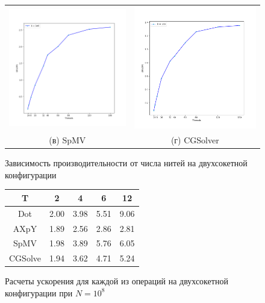 \documentclass[12pt, a4paper]{article}
\begin{document}
\begin{figure}[H]
\begin{tabular}{cc}
		\includegraphics[width=85mm]{multithread_polus_spmv2} & \includegraphics[width=85mm]{multithread_polus_cgsolver2} \\
		(в) SpMV & (г) CGSolver \\[6pt]
	\end{tabular}
	\caption{Зависимость производительности от числа нитей на двухсокетной конфигурации}
	\label{fig:multithread_flops_polus2} 
\end{figure}
\fi

\begin{figure}[H]
	\center
	\setlength{\tabcolsep}{10pt}
	\renewcommand{\arraystretch}{1.5}
		\begin{tabular}{|c|c|c|c|c|}
		\hline
		T & 2 & 4 & 6 & 12  \\
		\hline
		Dot & 2.00 & 3.98 & 5.51 & 9.06 \\
		\hline
		AXpY & 1.89 & 2.56 & 2.86 & 2.81 \\
		\hline
		SpMV & 1.98 & 3.89 & 5.76 & 6.05 \\
		\hline
		CGSolve & 1.94 & 3.62 & 4.71 & 5.24 \\
		\hline
	\end{tabular}
	\caption{Расчеты ускорения для каждой из операций на двухсокетной конфигурации при $N = 10^8$}
	\label{fig:speedup2}
\end{figure}
\end{document}
